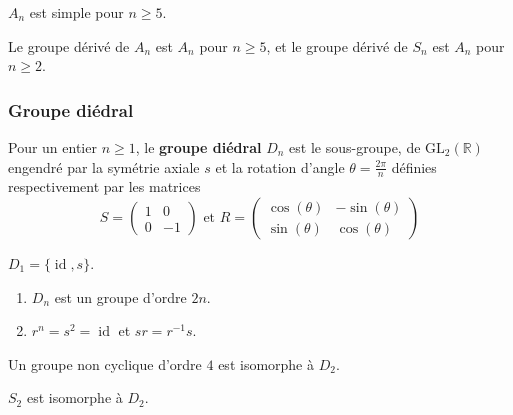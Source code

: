 	\begin{theorem}
		$A_n$ est simple pour $n \geq 5$.
	\end{theorem}
	
	\begin{corollary}
		Le groupe dérivé de $A_n$ est $A_n$ pour $n \geq 5$, et le groupe dérivé de $S_n$ est $A_n$ pour $n \geq 2$.
	\end{corollary}

	\subsubsection{Groupe diédral}
	
	
	\begin{definition}
		Pour un entier $n \geq 1$, le \textbf{groupe diédral} $D_n$ est le sous-groupe, de $\mathrm{GL}_2(\mathbb{R})$ engendré par la symétrie axiale $s$ et la rotation d'angle $\theta = \frac{2\pi}{n}$ définies respectivement par les matrices
		\[
		S =
		\begin{pmatrix}
			1 & 0 \\
			0 & -1
		\end{pmatrix}
		\text{ et }
		R =
		\begin{pmatrix}
			\cos(\theta) & -\sin(\theta) \\
			\sin(\theta) & \cos(\theta)
		\end{pmatrix}
		\]
	\end{definition}
	
	\begin{example}
		$D_1 = \{ \operatorname{id}, s \}$.
	\end{example}
	
	\begin{proposition}
		\begin{enumerate}[label=(\roman*)]
			\item $D_n$ est un groupe d'ordre $2n$.
			\item $r^n = s^2 = \operatorname{id}$ et $sr = r^{-1}s$.
		\end{enumerate}
	\end{proposition}
	
	\reference{28}
	
	\begin{proposition}
		Un groupe non cyclique d'ordre $4$ est isomorphe à $D_2$.
	\end{proposition}
	
	
	\begin{example}
		$S_2$ est isomorphe à $D_2$.
	\end{example}
	
